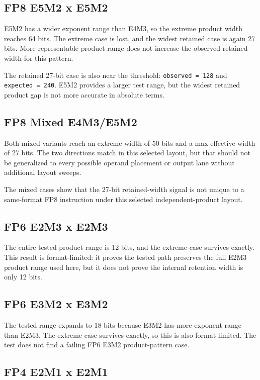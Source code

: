 \documentclass[11pt]{article}
\begin{document}
\subsection{FP8 E5M2 x E5M2}

E5M2 has a wider exponent range than E4M3, so the extreme product width reaches
64 bits. The extreme case is lost, and the widest retained case is again 27
bits. More representable product range does not increase the observed retained
width for this pattern.

The retained 27-bit case is also near the threshold:
\texttt{observed = 128} and \texttt{expected = 240}. E5M2 provides a larger
test range, but the widest retained product gap is not more accurate in
absolute terms.

\subsection{FP8 Mixed E4M3/E5M2}

Both mixed variants reach an extreme width of 50 bits and a max effective width
of 27 bits. The two directions match in this selected layout, but that should
not be generalized to every possible operand placement or output lane without
additional layout sweeps.

The mixed cases show that the 27-bit retained-width signal is not unique to a
same-format FP8 instruction under this selected independent-product layout.

\subsection{FP6 E2M3 x E2M3}

The entire tested product range is 12 bits, and the extreme case survives
exactly. This result is format-limited: it proves the tested path preserves the
full E2M3 product range used here, but it does not prove the internal retention
width is only 12 bits.

\subsection{FP6 E3M2 x E3M2}

The tested range expands to 18 bits because E3M2 has more exponent range than
E2M3. The extreme case survives exactly, so this is also format-limited. The
test does not find a failing FP6 E3M2 product-pattern case.

\subsection{FP4 E2M1 x E2M1}
\end{document}
